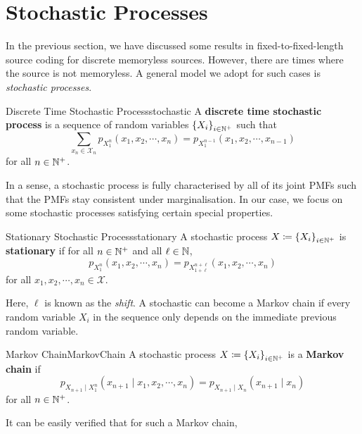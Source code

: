 \documentclass[math, code]{amznotes}
\theoremstyle{remark}
\begin{document}
\section{Stochastic Processes}
In the previous section, we have discussed some results in fixed-to-fixed-length source coding for discrete memoryless sources. However, there are times where the source is not memoryless. A general model we adopt for such cases is \textit{stochastic processes}.
\begin{dfnbox}{Discrete Time Stochastic Process}{stochastic}
    A {\color{red} \textbf{discrete time stochastic process}} is a sequence of random variables $\left\{X_i\right\}_{i \in \mathbb{N}^+}$ such that 
    \begin{equation*}
        \sum_{x_n \in \mathcal{X}_n}p_{X_1^n}\left(x_1, x_2, \cdots, x_n\right) = p_{X_1^{n - 1}}\left(x_1, x_2, \cdots, x_{n - 1}\right)
    \end{equation*}
    for all $n \in \mathbb{N}^+$.
\end{dfnbox}
In a sense, a stochastic process is fully characterised by all of its joint PMFs such that the PMFs stay consistent under marginalisation. In our case, we focus on some stochastic processes satisfying certain special properties.
\begin{dfnbox}{Stationary Stochastic Process}{stationary}
    A stochastic process $X \coloneqq \left\{X_i\right\}_{i \in \mathbb{N}^+}$ is {\color{red} \textbf{stationary}} if for all $n \in \mathbb{N}^+$ and all $\ell \in \mathbb{N}$, 
    \begin{equation*}
        p_{X_1^n}\left(x_1, x_2, \cdots, x_n\right) = p_{X_{1 + \ell}^{n + \ell}}\left(x_1, x_2, \cdots, x_n\right)
    \end{equation*}
    for all $x_1, x_2, \cdots, x_n \in \mathcal{X}$.
\end{dfnbox}
Here, $\ell$ is known as the \textit{shift}. A stochastic can become a Markov chain if every random variable $X_i$ in the sequence only depends on the immediate previous random variable.
\begin{dfnbox}{Markov Chain}{MarkovChain}
    A stochastic process $X \coloneqq \left\{X_i\right\}_{i \in \mathbb{N}^+}$ is a {\color{red} \textbf{Markov chain}} if 
    \begin{equation*}
        p_{X_{n + 1} \mid X_1^n}\left(x_{n + 1} \mid x_1, x_2, \cdots, x_n\right) = p_{X_{n + 1} \mid X_n}\left(x_{n + 1} \mid x_n\right)
    \end{equation*}
    for all $n \in \mathbb{N}^+$.
\end{dfnbox}
It can be easily verified that for such a Markov chain,
\end{document}
